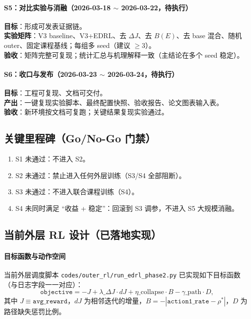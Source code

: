 \documentclass[UTF8,11pt,a4paper]{ctexart}
\begin{document}
\paragraph{S5：对比实验与消融（2026-03-18 $\sim$ 2026-03-22，待执行）}
\textbf{目标}：形成可发表证据链。\\
\textbf{实验矩阵}：V3 baseline、V3+EDRL、去 $\Delta J$、去 $B(E)$、去 base 混合、随机 outer、固定课程基线；每组多 seed（建议 $\ge 3$）。\\
\textbf{验收}：矩阵完整可复现；统计汇总与机理解释一致（主结论在多个 seed 稳定）。

\paragraph{S6：收口与发布（2026-03-23 $\sim$ 2026-03-24，待执行）}
\textbf{目标}：工程可复现、文档可交付。\\
\textbf{产出}：一键复现实验脚本、最终配置快照、验收报告、论文图表输入表。\\
\textbf{验收}：新环境按文档可复跑；关键结果复现实验通过。

\subsection{关键里程碑（Go/No-Go 门禁）}
\begin{enumerate}
\item S1 未通过：不进入 S2。
\item S2 未通过：禁止进入任何外层训练（S3/S4 全部阻断）。
\item S3 未通过：不进入联合课程训练（S4）。
\item S4 未同时满足 ``收益 + 稳定''：回滚到 S3 调参，不进入 S5 大规模消融。
\end{enumerate}

\subsection{当前外层 RL 设计（已落地实现）}
\paragraph{目标函数与动作空间}
当前外层调度脚本 \texttt{codes/outer\_rl/run\_edrl\_phase2.py} 已实现如下目标函数（与日志字段一一对应）：
\begin{equation}
\texttt{objective}=-J+\lambda\_{\Delta J}\cdot dJ+\eta\_{\mathrm{collapse}}\cdot B-\gamma\_{\mathrm{path}}\cdot D,
\end{equation}
其中 $J\equiv\texttt{avg\_reward}$，$dJ$ 为相邻迭代的增量，$B=-|\texttt{action1\_rate}-\rho^*|$，$D$ 为路径缺失惩罚比例。
\end{document}
